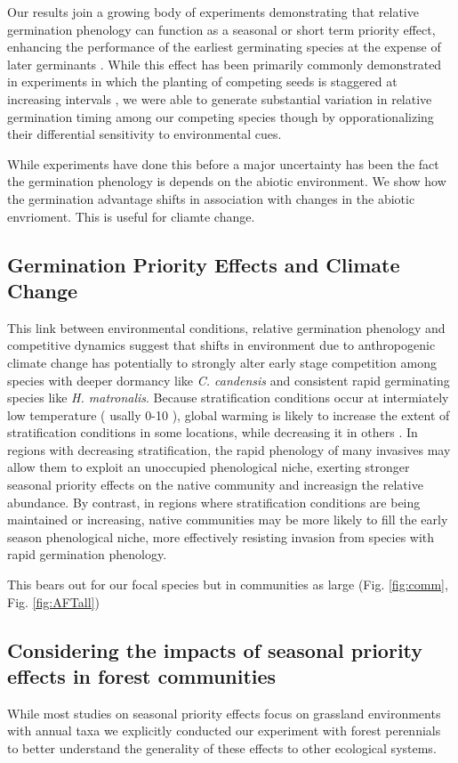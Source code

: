 \documentclass{article}\usepackage[]{graphicx}\usepackage[]{color}
\begin{document}
{Our results join a growing body of experiments demonstrating that relative germination phenology can function as a seasonal or short term priority effect, enhancing the performance of the earliest germinating species at the expense of later germinants \citep{}. While this effect has been primarily commonly demonstrated in experiments in which the planting of competing seeds is staggered at increasing intervals \citep{}, we were able to generate substantial variation in relative germination timing among our competing species though by opporationalizing their differential sensitivity to environmental cues. 

While experiments have done this before a major uncertainty has been the fact the germination phenology is depends on the abiotic environment. We show how the germination advantage shifts in association with changes in the abiotic envrioment. This is useful for cliamte change.

\subsection{Germination Priority Effects and Climate Change}

This link between environmental conditions, relative germination phenology and competitive dynamics suggest that shifts in environment due to anthropogenic climate change has potentially to strongly alter early stage competition among species with deeper dormancy like \textit{C. candensis} and consistent rapid germinating species like \textit{H. matronalis}. Because stratification conditions occur at intermiately low temperature ( usally 0-10  \degreeC \citep{}), global warming is likely to increase the extent of stratification conditions in some locations, while decreasing it in others \citep{}. In regions with decreasing stratification, the rapid phenology of many invasives may allow them to exploit an unoccupied phenological niche, exerting stronger seasonal priority effects on the native community and increasign the relative abundance. By contrast, in regions where stratification conditions are being maintained or increasing, native communities may be more likely to fill the early season phenological niche, more effectively resisting invasion from species with rapid germination phenology.

This bears out for our focal species but in communities as large (Fig. \ref{fig:comm}, Fig. \ref{fig:AFTall})

\subsection*{Considering the impacts of seasonal priority effects in forest communities}
While most studies on seasonal priority effects focus on grassland environments with annual taxa \citep{} we explicitly conducted our experiment with forest perennials to better understand the generality of these effects to other ecological systems. 



}
\end{document}
